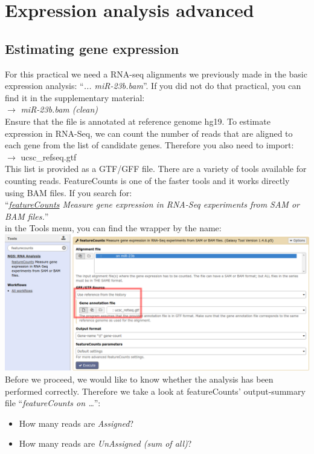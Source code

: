 \section{Expression analysis advanced}
\subsection{Estimating gene expression}
For this practical we need a RNA-seq alignments we previously made in the basic expression analysis: ``\textit{... miR-23b.bam}''. If you did not do that practical, you can find it in the supplementary material: \\
\datalibrarydirrnaseqadvanced $\rightarrow$ \textit{miR-23b.bam (clean)}\\
Ensure that the file is annotated at reference genome hg19. To estimate expression in RNA-Seq, we can count the number of reads that are aligned to each gene from the list of candidate genes. Therefore you also need to import:\\
\datalibrarydirrnaseqadvanced $\rightarrow$ ucsc\_refseq.gtf\\
This list is provided as a GTF/GFF file.
There are a variety of tools available for counting reads.
FeatureCounts is one of the faster tools and it works directly using BAM files. If you search for:\\
``\textit{\underline{featureCounts} Measure gene expression in RNA-Seq experiments from SAM or BAM files.}''\\
in the Tools menu, you can find the wrapper by the name:\\
\includegraphics[width=\textwidth]{figures/expression_01.png}\\
Before we proceed, we would like to know whether the analysis has been performed correctly. Therefore we take a look at featureCounts’ output-summary file ``\textit{featureCounts on \ldots}'':
\begin{itemize}
	\item How many reads are \textit{Assigned}?
	\item How many reads are \textit{UnAssigned (sum of all)}?
\end{itemize}
